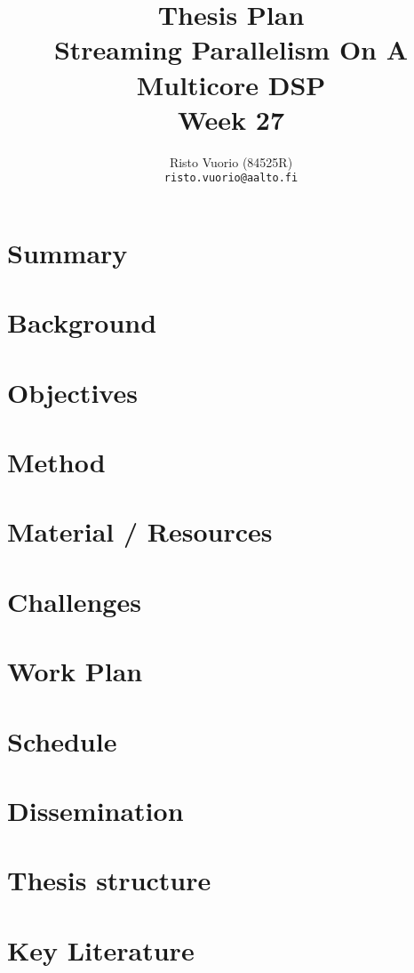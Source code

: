 \documentclass[a4paper,10pt]{article}
\title{Thesis Plan \\
		Streaming Parallelism On A Multicore DSP \\
		Week 27}
\author{Risto Vuorio (84525R) \\
		{\tt risto.vuorio@aalto.fi}}
\begin{document}
\maketitle
\newpage
\tableofcontents
\newpage

\section{Summary}


\section{Background}


\section{Objectives}


\section{Method}


\section{Material / Resources}


\section{Challenges}


\section{Work Plan}


\section{Schedule}


\section{Dissemination}


\pagebreak
\begin{appendices}
  \section{Thesis structure}
  

  \section{Key Literature}
  
\end{appendices}
\end{document}
